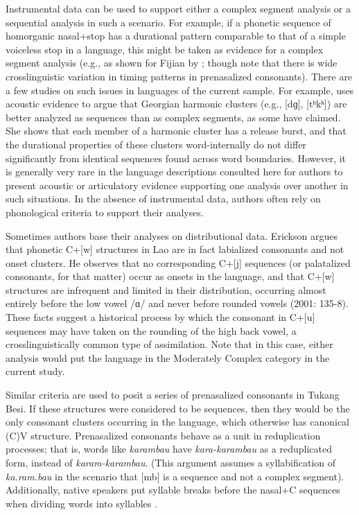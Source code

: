   Instrumental data can be used to support either a complex segment analysis or a sequential analysis in such a scenario. For example, if a phonetic sequence of homorganic nasal+stop has a durational pattern comparable to that of a simple voiceless stop in a language, this might be taken as evidence for a complex segment analysis (e.g., as shown for Fijian by \citealt{Maddieson1989a}; though \citealt{LadefogedMaddieson1996} note that there is wide crosslinguistic variation in timing patterns in prenasalized consonants). There are a few studies on such issues in languages of the current sample. For example, \citet{Chitoran1998} uses acoustic evidence to argue that Georgian harmonic clusters (e.g., [dɡ], [tʰkʰ]) are better analyzed as sequences than as complex segments, as some have claimed. She shows that each member of a harmonic cluster has a release burst, and that the durational properties of these clusters word-internally do not differ significantly from identical sequences found across word boundaries. However, it is generally very rare in the language descriptions consulted here for authors to present acoustic or articulatory evidence supporting one analysis over another in such situations. In the absence of instrumental data, authors often rely on phonological criteria to support their analyses.

  Sometimes authors base their analyses on distributional data. Erickson argues that phonetic C+[w] structures in Lao are in fact labialized consonants and not onset clusters. He observes that no corresponding C+[j] sequences (or palatalized consonants, for that matter) occur as onsets in the language, and that C+[w] structures are infrequent and limited in their distribution, occurring almost entirely before the low vowel /ɑ/ and never before rounded vowels (2001: 135-8). These facts suggest a historical process by which the consonant in C+[u] sequences may have taken on the rounding of the high back vowel, a crosslinguistically common type of assimilation. Note that in this case, either analysis would put the language in the Moderately Complex category in the current study.

  Similar criteria are used to posit a series of prenasalized consonants in Tukang Besi. If these structures were considered to be sequences, then they would be the only consonant clusters occurring in the language, which otherwise has canonical (C)V structure. Prenasalized consonants behave as a unit in reduplication processes; that is, words like \textit{karambau} have \textit{kara-karambau} as a reduplicated form, instead of \textit{karam-karambau}. (This argument assumes a syllabification of \textit{ka.ram.bau} in the scenario that [mb] is a sequence and not a complex segment). Additionally, native speakers put syllable breaks before the nasal+C sequences when dividing words into syllables \citep[30-31]{Donohue1999}. 

